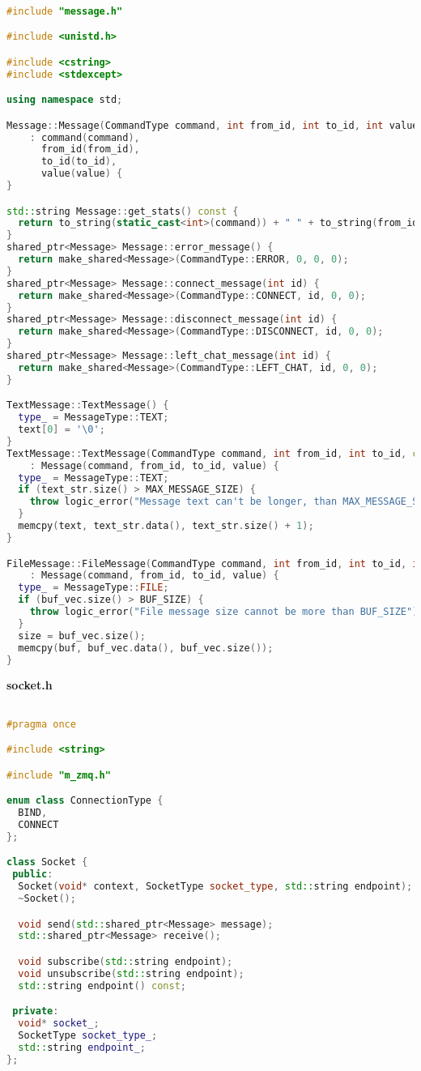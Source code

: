 \begin{lstlisting}[language=C++]

#include "message.h"

#include <unistd.h>

#include <cstring>
#include <stdexcept>

using namespace std;

Message::Message(CommandType command, int from_id, int to_id, int value)
    : command(command),
      from_id(from_id),
      to_id(to_id),
      value(value) {
}

std::string Message::get_stats() const {
  return to_string(static_cast<int>(command)) + " " + to_string(from_id) + " " + to_string(to_id) + " " + to_string(value);
}
shared_ptr<Message> Message::error_message() {
  return make_shared<Message>(CommandType::ERROR, 0, 0, 0);
}
shared_ptr<Message> Message::connect_message(int id) {
  return make_shared<Message>(CommandType::CONNECT, id, 0, 0);
}
shared_ptr<Message> Message::disconnect_message(int id) {
  return make_shared<Message>(CommandType::DISCONNECT, id, 0, 0);
}
shared_ptr<Message> Message::left_chat_message(int id) {
  return make_shared<Message>(CommandType::LEFT_CHAT, id, 0, 0);
}

TextMessage::TextMessage() {
  type_ = MessageType::TEXT;
  text[0] = '\0';
}
TextMessage::TextMessage(CommandType command, int from_id, int to_id, const string& text_str, int value)
    : Message(command, from_id, to_id, value) {
  type_ = MessageType::TEXT;
  if (text_str.size() > MAX_MESSAGE_SIZE) {
    throw logic_error("Message text can't be longer, than MAX_MESSAGE_SIZE");
  }
  memcpy(text, text_str.data(), text_str.size() + 1);
}

FileMessage::FileMessage(CommandType command, int from_id, int to_id, int value, const vector<uint8_t>& buf_vec)
    : Message(command, from_id, to_id, value) {
  type_ = MessageType::FILE;
  if (buf_vec.size() > BUF_SIZE) {
    throw logic_error("File message size cannot be more than BUF_SIZE");
  }
  size = buf_vec.size();
  memcpy(buf, buf_vec.data(), buf_vec.size());
}


\end{lstlisting}

\textbf{socket.h}

\begin{lstlisting}[language=C++]

#pragma once

#include <string>

#include "m_zmq.h"

enum class ConnectionType {
  BIND,
  CONNECT
};

class Socket {
 public:
  Socket(void* context, SocketType socket_type, std::string endpoint);
  ~Socket();

  void send(std::shared_ptr<Message> message);
  std::shared_ptr<Message> receive();

  void subscribe(std::string endpoint);
  void unsubscribe(std::string endpoint);
  std::string endpoint() const;

 private:
  void* socket_;
  SocketType socket_type_;
  std::string endpoint_;
};

\end{lstlisting}

